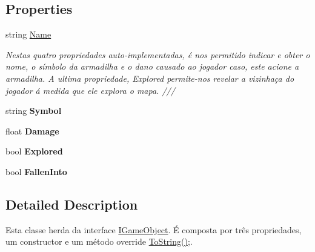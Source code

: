 \subsection*{Properties}
\begin{DoxyCompactItemize}
\item 
string \mbox{\hyperlink{class_projeto2___l_p1_1_1_trap_a8e8d228475e53830ada606ef606d3d5b}{Name}}
\begin{DoxyCompactList}\small\item\em Nestas quatro propriedades auto-\/implementadas, é nos permitido indicar e obter o nome, o símbolo da armadilha e o dano causado ao jogador caso, este acione a armadilha. A ultima propriedade, Explored permite-\/nos revelar a vizinhaça do jogador á medida que ele explora o mapa. /// \end{DoxyCompactList}\item 
\mbox{\label{class_projeto2___l_p1_1_1_trap_a5afe950d29e8c2dbb89d7484dea27ec7}} 
string {\bfseries Symbol}
\item 
\mbox{\label{class_projeto2___l_p1_1_1_trap_a0cc174cc03bd82fb6159af05fc499b5f}} 
float {\bfseries Damage}
\item 
\mbox{\label{class_projeto2___l_p1_1_1_trap_adbfd66d1118ab4ef938fc5ce2416ab2b}} 
bool {\bfseries Explored}
\item 
\mbox{\label{class_projeto2___l_p1_1_1_trap_af079644604a13ccac0e69a6b6962f70e}} 
bool {\bfseries Fallen\+Into}
\end{DoxyCompactItemize}


\subsection{Detailed Description}
Esta classe herda da interface \mbox{\hyperlink{interface_projeto2___l_p1_1_1_i_game_object}{I\+Game\+Object}}. É composta por três propriedades, um constructor e um método override \mbox{\hyperlink{class_projeto2___l_p1_1_1_trap_a1abb25aa0b1f0b59026e9985a14875bf}{To\+String()}};. 



